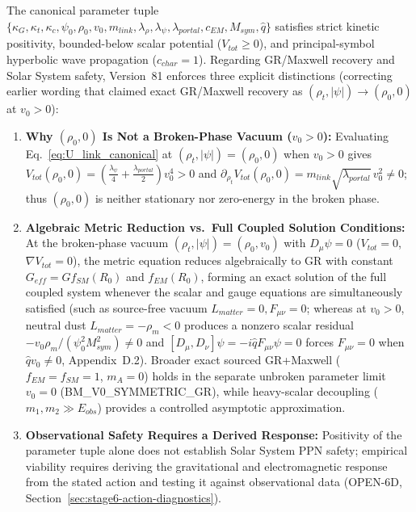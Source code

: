 \documentclass[american,11pt,letterpaper]{article}
\def\mathcal#1{#1}%
\def\mathrm#1{#1}%
\def\texttt#1{#1}%
\def\emph#1{#1}%
\begin{document}
The canonical parameter tuple $\{\kappa_G, \kappa_t, \kappa_c, \psi_0, \rho_0, v_0, m_{\mathrm{link}}, \lambda_\rho, \lambda_\psi, \lambda_{\mathrm{portal}}, c_{\mathrm{EM}}, M_{\mathrm{sym}}, \hat{q}\}$ satisfies strict kinetic positivity, bounded-below scalar potential ($V_{\mathrm{tot}} \ge 0$), and principal-symbol hyperbolic wave propagation ($c_{\mathrm{char}} = 1$). Regarding GR/Maxwell recovery and Solar System safety, Version~81 enforces three explicit distinctions (correcting earlier wording that claimed exact GR/Maxwell recovery as $(\rho_t, |\psi|) \to (\rho_0, 0)$ at $v_0 > 0$):
\begin{enumerate}[leftmargin=2em]
  \item \textbf{Why $(\rho_0, 0)$ Is Not a Broken-Phase Vacuum ($v_0 > 0$):} Evaluating Eq.~\eqref{eq:U_link_canonical} at $(\rho_t, |\psi|) = (\rho_0, 0)$ when $v_0 > 0$ gives $V_{\mathrm{tot}}(\rho_0, 0) = (\frac{\lambda_\psi}{4} + \frac{\lambda_{\mathrm{portal}}}{2})v_0^4 > 0$ and $\partial_{\rho_t} V_{\mathrm{tot}}(\rho_0, 0) = m_{\mathrm{link}}\sqrt{\lambda_{\mathrm{portal}}}\,v_0^2 \ne 0$; thus $(\rho_0, 0)$ is neither stationary nor zero-energy in the broken phase.
  \item \textbf{Algebraic Metric Reduction vs.\ Full Coupled Solution Conditions:} At the broken-phase vacuum $(\rho_t, |\psi|) = (\rho_0, v_0)$ with $D_\mu\psi = 0$ ($V_{\mathrm{tot}} = 0$, $\nabla V_{\mathrm{tot}} = 0$), the metric equation reduces \emph{algebraically} to GR with constant $G_{\mathrm{eff}} = G f_{\mathrm{SM}}(R_0)$ and $f_{\mathrm{EM}}(R_0)$, forming an exact solution of the full coupled system whenever the scalar and gauge equations are simultaneously satisfied (such as source-free vacuum $\mathcal{L}_{\mathrm{matter}} = 0, F_{\mu\nu} = 0$; whereas at $v_0 > 0$, neutral dust $\mathcal{L}_{\mathrm{matter}} = -\rho_m < 0$ produces a nonzero scalar residual $-v_0\rho_m/(\psi_0^2 M_{\mathrm{sym}}^2) \ne 0$ and $[D_\mu, D_\nu]\psi = -i\hat{q}F_{\mu\nu}\psi = 0$ forces $F_{\mu\nu} = 0$ when $\hat{q}v_0 \ne 0$, Appendix~D.2). Broader exact sourced GR+Maxwell ($f_{\mathrm{EM}} = f_{\mathrm{SM}} = 1$, $m_A = 0$) holds in the separate unbroken parameter limit $v_0 = 0$ (\texttt{BM\_V0\_SYMMETRIC\_GR}), while heavy-scalar decoupling ($m_1, m_2 \gg E_{\mathrm{obs}}$) provides a controlled asymptotic approximation.
  \item \textbf{Observational Safety Requires a Derived Response:} Positivity of the parameter tuple alone does \emph{not} establish Solar System PPN safety; empirical viability requires deriving the gravitational and electromagnetic response from the stated action and testing it against observational data (\texttt{OPEN-6D}, Section~\ref{sec:stage6-action-diagnostics}).
\end{enumerate}
\end{document}
